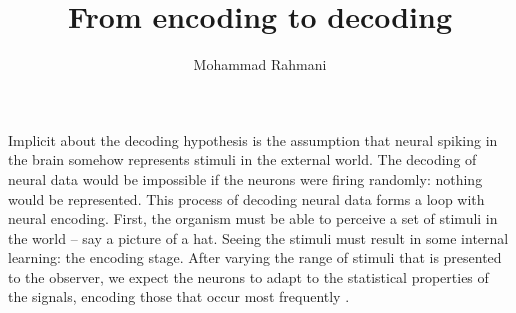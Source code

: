 \documentclass[a4paper]{article}
\title{From encoding to decoding}
\date{}
\author{Mohammad Rahmani}
\begin{document}
    \maketitle
    Implicit about the decoding hypothesis is the assumption that neural spiking in the brain somehow represents stimuli in the external world. The decoding of neural data would be impossible if the neurons were firing randomly: nothing would be represented. This process of decoding neural data forms a loop with neural encoding. First, the organism must be able to perceive a set of stimuli in the world – say a picture of a hat. Seeing the stimuli must result in some internal learning: the encoding stage. After varying the range of stimuli that is presented to the observer, we expect the neurons to adapt to the statistical properties of the signals, encoding those that occur most frequently .
    
    
\end{document}
